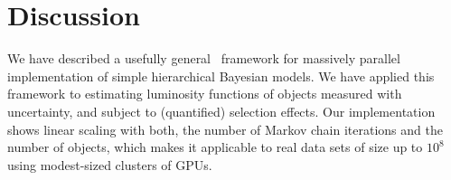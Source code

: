 \section{Discussion}
\label{sec:discussion}

We have described a usefully general \Cpp\ framework for massively parallel implementation of simple hierarchical Bayesian models.
We have applied this framework to estimating luminosity functions of objects measured with uncertainty, and subject to (quantified) selection effects.
Our implementation shows linear scaling with both, the number of Markov chain iterations and the number of objects, which makes it applicable to real data sets of size up to $10^{8}$ using modest-sized clusters of GPUs.

